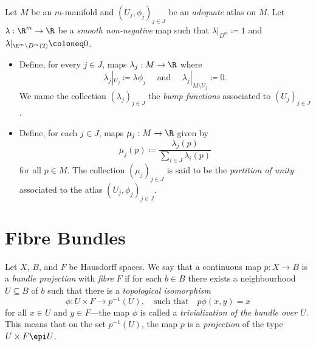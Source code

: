 \begin{definition}
\label{def:}
Let \(M\) be an \(m\)-manifold and \((U_{j}, \phi_j)_{j \in J}\) be an
\emph{adequate} atlas on \(M\). Let \(\lambda: \R^m \to \R\) be a \emph{smooth
  non-negative} map such that \(\lambda|_{D^m} \coloneq 1\) and
\(\lambda|_{\R^m \setminus D^m(2)} \coloneq 0\).
\begin{itemize}\setlength\itemsep{0em}
\item Define, for every \(j \in J\), maps \(\lambda_j: M \to \R\) where
  \[
  \lambda_j|_{U_j} \coloneq \lambda \phi_j
  \quad\text{ and }\quad
  \lambda_j|_{M \setminus U_j} \coloneq 0.
  \]
  We name the collection \((\lambda_j)_{j \in J}\) the \emph{bump functions}
  associated to \((U_j)_{j \in J}\).
\item Define, for each \(j \in J\), maps \(\mu_j: M \to \R\) given by
  \[
  \mu_j(p) \coloneq \frac{\lambda_j(p)}{\sum_{i \in J} \lambda_i(p)}
  \]
  for all \(p \in M\). The collection \((\mu_j)_{j \in J}\) is said to be the
  \emph{partition of unity} associated to the atlas \((U_j, \phi_j)_{j \in J}\).
\end{itemize}
\end{definition}

\section{Fibre Bundles}

\begin{definition}
\label{def:bundle-projection}
Let \(X\), \(B\), and \(F\) be Hausdorff spaces. We say that a continuous map
\(p: X \to B\) is a \emph{bundle projection} with \emph{fibre} \(F\) if for each
\(b \in B\) there exists a neighbourhood \(U \subseteq B\) of \(b\) such that
there is a \emph{topological isomorphism}
\[
\phi: U \times F \longrightarrow p^{-1}(U),
\quad\text{such that}\quad
p \phi(x, y) = x
\]
for all \(x \in U\) and \(y \in F\)---the map \(\phi\) is called a
\emph{trivialization of the bundle over \(U\)}. This means that on the set
\(p^{-1}(U)\), the map \(p\) is a \emph{projection} of the type
\(U \times F \epi U\).
\end{definition}

